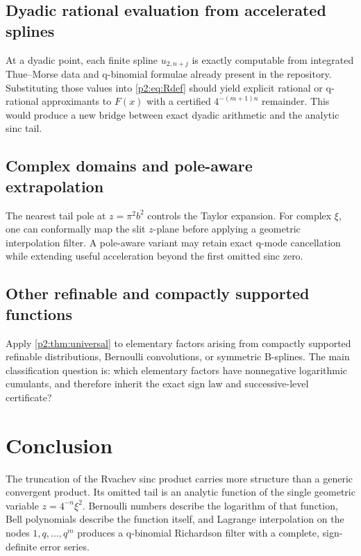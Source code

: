 \documentclass[11pt,oneside]{article}
\numberwithin{equation}{section}
\theoremstyle{definition}
\theoremstyle{remark}
\begin{document}
\subsection{Dyadic rational evaluation from accelerated splines}

At a dyadic point, each finite spline \(u_{2,n+j}\) is exactly computable from
integrated Thue--Morse data and q-binomial formulae already present in the
repository. Substituting those values into \eqref{p2:eq:Rdef} should yield explicit
rational or q-rational approximants to \(F(x)\) with a certified
\(4^{-(m+1)n}\) remainder. This would produce a new bridge between exact dyadic
arithmetic and the analytic sinc tail.

\subsection{Complex domains and pole-aware extrapolation}

The nearest tail pole at \(z=\pi^2b^2\) controls the Taylor expansion. For
complex \(\xi\), one can conformally map the slit \(z\)-plane before applying a
geometric interpolation filter. A pole-aware variant may retain exact q-mode
cancellation while extending useful acceleration beyond the first omitted sinc
zero.

\subsection{Other refinable and compactly supported functions}

Apply \cref{p2:thm:universal} to elementary factors arising from compactly
supported refinable distributions, Bernoulli convolutions, or symmetric
B-splines. The main classification question is: which elementary factors have
nonnegative logarithmic cumulants, and therefore inherit the exact sign law and
successive-level certificate?

\section{Conclusion}

The truncation of the Rvachev sinc product carries more structure than a generic
convergent product. Its omitted tail is an analytic function of the single
geometric variable \(z=4^{-n}\xi^2\). Bernoulli numbers describe the logarithm
of that function, Bell polynomials describe the function itself, and Lagrange
interpolation on the nodes \(1,q,\ldots,q^m\) produces a q-binomial Richardson
filter with a complete, sign-definite error series.
\end{document}
